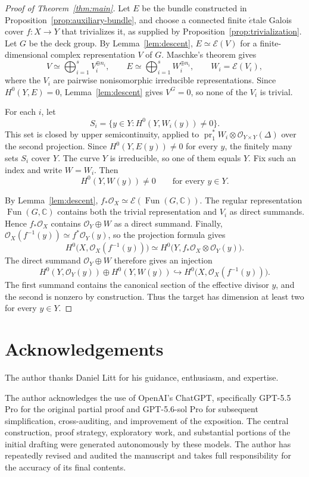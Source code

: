 \documentclass[a4paper]{amsart}
\theoremstyle{remark}
\DeclareMathOperator{\Fun}{Fun}
\newcommand{\OO}{\mathcal O}
\newcommand{\CC}{\mathbb C}
\begin{document}
\begin{proof}[Proof of Theorem~\ref{thm:main}]
Let \(E\) be the bundle constructed in Proposition~\ref{prop:auxiliary-bundle}, and choose a connected finite \(\acute{e}\)tale Galois cover
\(f:X\to Y\) that trivializes it, as supplied by Proposition~\ref{prop:trivialization}.  Let \(G\) be the deck group.  By Lemma~\ref{lem:descent},
\(E\simeq\mathcal E(V)\) for a finite-dimensional complex representation \(V\) of \(G\).  Maschke's theorem gives
\[
 V\simeq\bigoplus_{i=1}^s V_i^{\oplus n_i},
 \qquad
 E\simeq\bigoplus_{i=1}^s W_i^{\oplus n_i},
 \qquad
 W_i=\mathcal E(V_i),
\]
where the \(V_i\) are pairwise nonisomorphic irreducible representations.  Since \(H^0(Y,E)=0\), Lemma~\ref{lem:descent} gives \(V^G=0\), so none of the \(V_i\) is trivial.

For each \(i\), let
\[
 S_i=\{y\in Y:H^0(Y,W_i(y))\neq 0\}.
\]
This set is closed by upper semicontinuity, applied to
\(\operatorname{pr}_1^*W_i\otimes\OO_{Y\times Y}(\Delta)\) over the second projection.  Since
\(H^0(Y,E(y))\neq 0\) for every \(y\), the finitely many sets \(S_i\) cover \(Y\).  The curve \(Y\) is irreducible, so one of them equals \(Y\).  Fix such an index and write \(W=W_i\).  Then
\[
 H^0(Y,W(y))\neq 0
 \qquad\text{for every }y\in Y.
\]

By Lemma~\ref{lem:descent},
\(f_*\OO_X\simeq\mathcal E(\Fun(G,\CC))\).  The regular representation \(\Fun(G,\CC)\) contains both the trivial representation and \(V_i\) as direct summands.  Hence \(f_*\OO_X\) contains \(\OO_Y\oplus W\) as a direct summand.  Finally,
\(\OO_X(f^{-1}(y))\simeq f^*\OO_Y(y)\), so the projection formula gives
\[
 H^0\bigl(X,\OO_X(f^{-1}(y))\bigr)
 \simeq H^0\bigl(Y,f_*\OO_X\otimes\OO_Y(y)\bigr).
\]
The direct summand \(\OO_Y\oplus W\) therefore gives an injection
\[
 H^0(Y,\OO_Y(y))\oplus H^0(Y,W(y))
 \hookrightarrow H^0\bigl(X,\OO_X(f^{-1}(y))\bigr).
\]
The first summand contains the canonical section of the effective divisor \(y\), and the second is nonzero by construction.  Thus the target has dimension at least two for every \(y\in Y\).
\end{proof}

\section*{Acknowledgements}

The author thanks Daniel Litt for his guidance, enthusiasm, and expertise.

The author acknowledges the use of OpenAI's ChatGPT, specifically GPT-5.5 Pro for the original partial proof and GPT-5.6-sol Pro for subsequent simplification, cross-auditing, and improvement of the exposition.  The central construction, proof strategy, exploratory work, and substantial portions of the initial drafting were generated autonomously by these models.  The author has repeatedly revised and audited the manuscript and takes full responsibility for the accuracy of its final contents.
\end{document}
